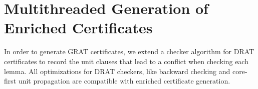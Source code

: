 \documentclass{llncs}
\begin{document}
%     
%   
%   
%       
%       
%     
%     
    
\section{Multithreaded Generation of Enriched Certificates}\label{sec:gratgen}
In order to generate GRAT certificates, we extend a checker algorithm for DRAT certificates 
to record the unit clauses that lead to a conflict when checking each lemma. 
All optimizations for DRAT checkers, like backward checking and core-first unit propagation are compatible with enriched certificate generation.
\end{document}
